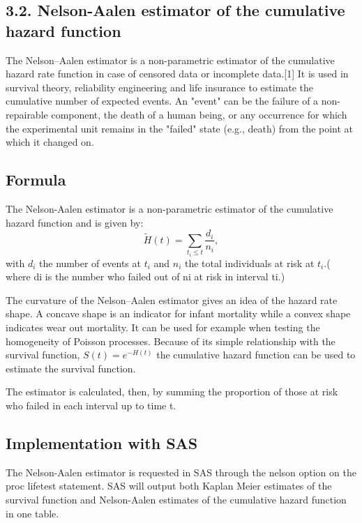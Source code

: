 \documentclass[]{article}
\title{}
\author{}
\begin{document}
	
\subsection*{3.2. Nelson-Aalen estimator of the cumulative hazard function}

The Nelson–Aalen estimator is a non-parametric estimator of the cumulative hazard rate function in case of censored data or incomplete data.[1] It is used in survival theory, reliability engineering and life insurance to estimate the cumulative number of expected events. An "event" can be the failure of a non-repairable component, the death of a human being, or any occurrence for which the experimental unit remains in the "failed" state (e.g., death) from the point at which it changed on. 

\subsection*{Formula}
The Nelson-Aalen estimator is a non-parametric estimator of the cumulative hazard function and is given by:
\[\tilde{H}(t)=\sum_{t_i\leq t}\frac{d_i}{n_i},\]
with $d_i$ the number of events at $t_i$ and $n_i$ the total individuals at risk at $t_i$.( %
where di is the number who failed out of ni at risk in interval ti.)

The curvature of the Nelson–Aalen estimator gives an idea of the hazard rate shape. A concave shape is an indicator for infant mortality while a convex shape indicates wear out mortality.
It can be used for example when testing the homogeneity of Poisson processes.
Because of its simple relationship with the survival function, $S(t)=e^{−H(t)}$ the cumulative hazard function can be used to estimate the survival function. 

 The estimator is calculated, then, by summing the proportion of those at risk who failed in each interval up to time t.

\subsection*{Implementation with SAS}
The Nelson-Aalen estimator is requested in SAS through the nelson option on the proc lifetest statement. SAS will output both Kaplan Meier estimates of the survival function and Nelson-Aalen estimates of the cumulative hazard function in one table.
\end{document}
